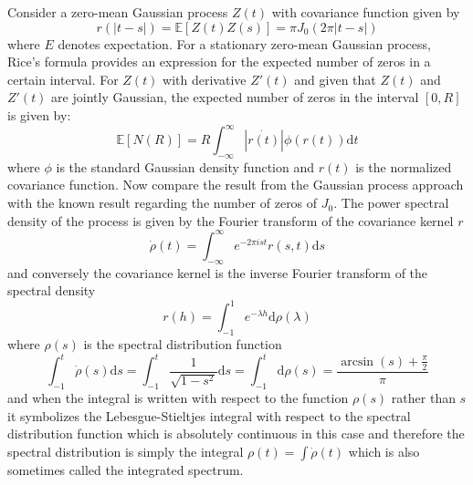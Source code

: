 \documentclass{article}
\newcommand{\mathd}{\mathrm{d}}
\begin{document}
Consider a zero-mean Gaussian process $Z (t)$ with covariance function given
by
\begin{equation}
  r (| t - s |) =\mathbb{E} [Z (t) Z (s)] = \pi J_0 (2 \pi | t - s |)
\end{equation}
where $E$ denotes expectation. For a stationary zero-mean Gaussian process,
Rice's formula{\cite[Theorem 2.2]{GaussianProcessLevelCrossings}} provides an
expression for the expected number of zeros in a certain interval. For $Z (t)$
with derivative $Z' (t)$ and given that $Z (t)$ and $Z' (t)$ are jointly
Gaussian, the expected number of zeros in the interval $[0, R]$ is given by:
\begin{equation}
  \mathbb{E} [N (R)] = R \int_{- \infty}^{\infty} | \dot{r (t)} | \phi (r (t))
  \mathd t
\end{equation}
where $\phi$ is the standard Gaussian density function and $r (t)$ is the
normalized covariance function. Now compare the result from the Gaussian
process approach with the known result regarding the number of zeros of $J_0$.
{\cite{esgpz}} The power spectral density of the process is given by the
Fourier transform of the covariance kernel $r$
\[ \dot{\rho} (t) = \int_{- \infty}^{\infty} e^{- 2 \pi i s t} r (s, t) \mathd
   s \]
and conversely the covariance kernel is the inverse Fourier transform of the
spectral density
\begin{equation}
  r (h) = \int_{- 1}^1 e^{- \lambda h} \mathd \rho (\lambda)
\end{equation}
where $\rho (s)$ is the spectral distribution function
\begin{equation}
  \int_{- 1}^t \dot{\rho} (s) \mathd s = \int_{- 1}^t \frac{1}{\sqrt{1 - s^2}}
  \mathd s = \int_{- 1}^t \mathd \rho (s) = \frac{\arcsin (s) +
  \frac{\pi}{2}}{\pi}
\end{equation}
and when the integral is written with respect to the function $\rho (s)$
rather than $s$ it symbolizes the Lebesgue-Stieltjes integral with respect to
the spectral distribution function which is absolutely continuous in this case
and therefore the spectral distribution is simply the integral $\rho (t) =
\int \dot{\rho} (t)$ which is also sometimes called the integrated spectrum.
{\cite{yaglom1987correlation}}{\cite{rao2014stochastic}}
\end{document}
